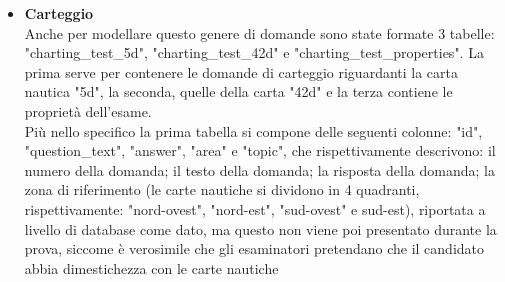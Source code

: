 \begin{itemize}
	\item \textbf{Carteggio}\\
	Anche per modellare questo genere di domande sono state formate 3 tabelle: "charting_test_5d", "charting_test_42d" e "charting_test_properties". La prima serve per contenere  le domande di carteggio riguardanti la carta nautica "5d", la seconda, quelle della carta "42d" e la terza contiene le proprietà dell'esame.\\
	Più nello specifico la prima tabella si compone delle seguenti colonne: "id", "question_text", "answer", "area" e "topic", che rispettivamente descrivono: il numero della domanda; il testo della domanda; la risposta della domanda; la zona di riferimento (le carte nautiche si dividono in 4 quadranti, rispettivamente: "nord-ovest", "nord-est", "sud-ovest" e sud-est), riportata a livello di database come dato, ma questo non viene poi presentato durante la prova, siccome è verosimile che gli esaminatori pretendano che il candidato abbia dimestichezza con le carte nautiche 
\end{itemize}
